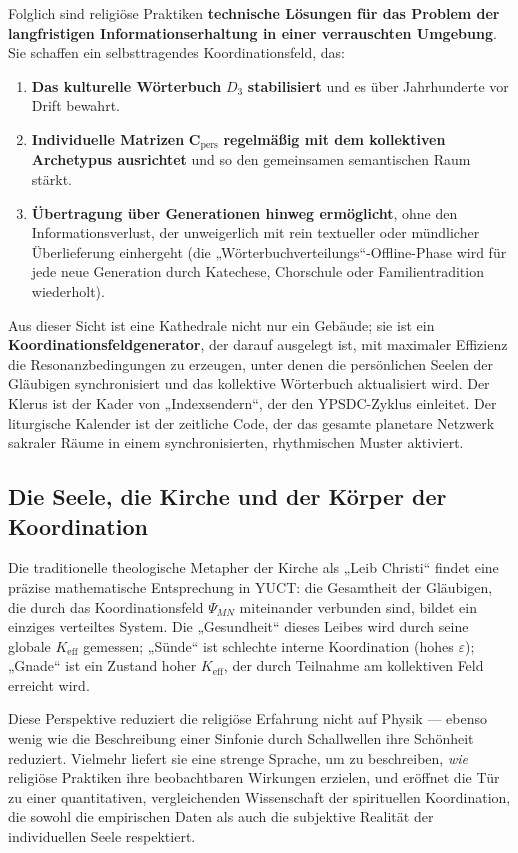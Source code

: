 \documentclass[12pt,a4paper]{article}
\begin{document}
	Folglich sind religiöse Praktiken \textbf{technische Lösungen für das Problem der langfristigen Informationserhaltung in einer verrauschten Umgebung}. Sie schaffen ein selbsttragendes Koordinationsfeld, das:
	\begin{enumerate}
		\item \textbf{Das kulturelle Wörterbuch} \(D_3\) \textbf{stabilisiert} und es über Jahrhunderte vor Drift bewahrt.
		\item \textbf{Individuelle Matrizen} \(\mathbf{C}_{\text{pers}}\) \textbf{regelmäßig mit dem kollektiven Archetypus ausrichtet} und so den gemeinsamen semantischen Raum stärkt.
		\item \textbf{Übertragung über Generationen hinweg ermöglicht}, ohne den Informationsverlust, der unweigerlich mit rein textueller oder mündlicher Überlieferung einhergeht (die „Wörterbuchverteilungs“-Offline-Phase wird für jede neue Generation durch Katechese, Chorschule oder Familientradition wiederholt).
	\end{enumerate}
	
	Aus dieser Sicht ist eine Kathedrale nicht nur ein Gebäude; sie ist ein \textbf{Koordinationsfeldgenerator}, der darauf ausgelegt ist, mit maximaler Effizienz die Resonanzbedingungen zu erzeugen, unter denen die persönlichen Seelen der Gläubigen synchronisiert und das kollektive Wörterbuch aktualisiert wird. Der Klerus ist der Kader von „Indexsendern“, der den YPSDC-Zyklus einleitet. Der liturgische Kalender ist der zeitliche Code, der das gesamte planetare Netzwerk sakraler Räume in einem synchronisierten, rhythmischen Muster aktiviert.
	
	\subsection{Die Seele, die Kirche und der Körper der Koordination}
	
	Die traditionelle theologische Metapher der Kirche als „Leib Christi“ findet eine präzise mathematische Entsprechung in YUCT: die Gesamtheit der Gläubigen, die durch das Koordinationsfeld \(\Psi_{MN}\) miteinander verbunden sind, bildet ein einziges verteiltes System. Die „Gesundheit“ dieses Leibes wird durch seine globale \(K_{\mathrm{eff}}\) gemessen; „Sünde“ ist schlechte interne Koordination (hohes \(\varepsilon\)); „Gnade“ ist ein Zustand hoher \(K_{\mathrm{eff}}\), der durch Teilnahme am kollektiven Feld erreicht wird.
	
	Diese Perspektive reduziert die religiöse Erfahrung nicht auf Physik — ebenso wenig wie die Beschreibung einer Sinfonie durch Schallwellen ihre Schönheit reduziert. Vielmehr liefert sie eine strenge Sprache, um zu beschreiben, \emph{wie} religiöse Praktiken ihre beobachtbaren Wirkungen erzielen, und eröffnet die Tür zu einer quantitativen, vergleichenden Wissenschaft der spirituellen Koordination, die sowohl die empirischen Daten als auch die subjektive Realität der individuellen Seele respektiert.
	
\end{document}
